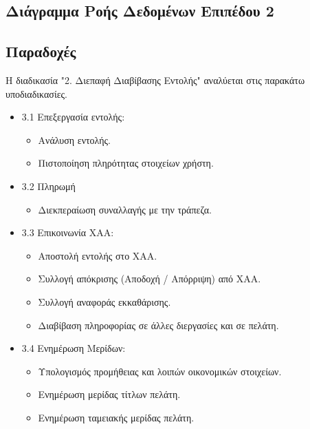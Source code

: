 \documentclass{article}
\begin{document}
	\newpage
	\subsection{Διάγραμμα Ροής Δεδομένων Επιπέδου 2}
	\subsection*{Παραδοχές}
	Η διαδικασία "2. Διεπαφή Διαβίβασης Εντολής" αναλύεται στις παρακάτω υποδιαδικασίες.
	\begin{itemize}
		\item 3.1 Επεξεργασία εντολής: 
			\begin{itemize}
				\item Ανάλυση εντολής.
				\item Πιστοποίηση πληρότητας στοιχείων χρήστη.
			\end{itemize}
		
		\item 3.2 Πληρωμή
			\begin{itemize}
				\item Διεκπεραίωση συναλλαγής με την τράπεζα.
			\end{itemize}

		\item 3.3 Επικοινωνία ΧΑΑ:
			\begin{itemize}
				\item Αποστολή εντολής στο ΧΑΑ.
				\item Συλλογή απόκρισης (Αποδοχή / Απόρριψη) από ΧΑΑ.
				\item Συλλογή αναφοράς εκκαθάρισης.
				\item Διαβίβαση πληροφορίας σε άλλες διεργασίες και σε πελάτη.
			\end{itemize}

		\item 3.4 Ενημέρωση Μερίδων:
		\begin{itemize}
			\item Υπολογισμός προμήθειας και λοιπών οικονομικών στοιχείων.
			\item Ενημέρωση μερίδας τίτλων πελάτη.
			\item Ενημέρωση ταμειακής μερίδας πελάτη.
		\end{itemize}
	\end{itemize}
\end{document}

